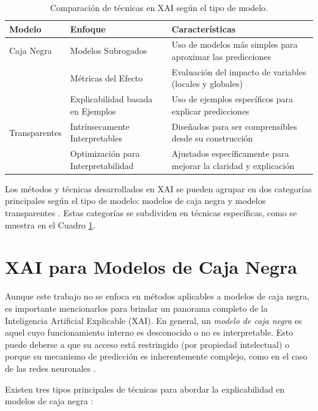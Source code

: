 \begin{table}[H]
    \centering
    \scriptsize %
    \renewcommand{\arraystretch}{1.5} %
    \begin{tabular}{p{3.5cm} p{5cm} p{5.8cm}}
        \toprule
        \textbf{Modelo} & \textbf{Enfoque} & \textbf{Características} \\
        \midrule
        Caja Negra & Modelos Subrogados & Uso de modelos más simples para aproximar las predicciones \\ 
        & Métricas del Efecto & Evaluación del impacto de variables (locales y globales) \\ 
        & Explicabilidad basada en Ejemplos & Uso de ejemplos específicos para explicar predicciones \\
        \midrule
        Transparentes & Intrínsecamente Interpretables & Diseñados para ser comprensibles desde su construcción \\
        & Optimización para Interpretabilidad & Ajustados específicamente para mejorar la claridad y explicación \\ 
        \bottomrule
    \end{tabular}
    \caption{Comparación de técnicas en XAI según el tipo de modelo.}
    \label{fig:cuadro-xai}
\end{table}

Los métodos y técnicas desarrollados en XAI se pueden agrupar en dos categorías principales según el tipo de modelo: modelos de caja negra y modelos transparentes \cite{curso-xai}. Estas categorías se subdividen en técnicas específicas, como se muestra en el Cuadro \ref{fig:cuadro-xai}.

\section{XAI para Modelos de Caja Negra}

Aunque este trabajo no se enfoca en métodos aplicables a modelos de caja negra, es importante mencionarlos para brindar un panorama completo de la Inteligencia Artificial Explicable (XAI). En general, un \emph{modelo de caja negra} es aquel cuyo funcionamiento interno es desconocido o no es interpretable. Esto puede deberse a que su acceso está restringido (por propiedad intelectual) o porque su mecanismo de predicción es inherentemente complejo, como en el caso de las redes neuronales \cite{curso-xai, Rudin-2019}.

Existen tres tipos principales de técnicas para abordar la explicabilidad en modelos de caja negra \cite{curso-xai}:

